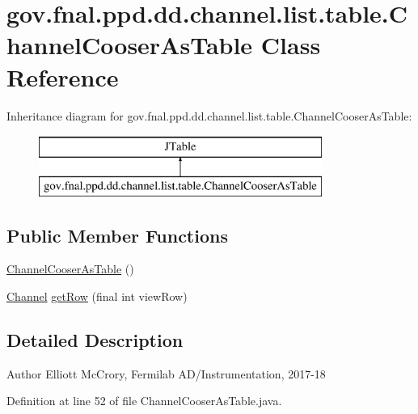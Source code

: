\hypertarget{classgov_1_1fnal_1_1ppd_1_1dd_1_1channel_1_1list_1_1table_1_1ChannelCooserAsTable}{\section{gov.\-fnal.\-ppd.\-dd.\-channel.\-list.\-table.\-Channel\-Cooser\-As\-Table Class Reference}
\label{classgov_1_1fnal_1_1ppd_1_1dd_1_1channel_1_1list_1_1table_1_1ChannelCooserAsTable}
}
Inheritance diagram for gov.\-fnal.\-ppd.\-dd.\-channel.\-list.\-table.\-Channel\-Cooser\-As\-Table\-:\begin{figure}[H]
\begin{center}
\leavevmode
\includegraphics[height=2.000000cm]{classgov_1_1fnal_1_1ppd_1_1dd_1_1channel_1_1list_1_1table_1_1ChannelCooserAsTable}
\end{center}
\end{figure}
\subsection*{Public Member Functions}
\begin{DoxyCompactItemize}
\item 
\hyperlink{classgov_1_1fnal_1_1ppd_1_1dd_1_1channel_1_1list_1_1table_1_1ChannelCooserAsTable_a3e9192a1e78a896dd27ed80ad78277df}{Channel\-Cooser\-As\-Table} ()
\item 
\hyperlink{interfacegov_1_1fnal_1_1ppd_1_1dd_1_1signage_1_1Channel}{Channel} \hyperlink{classgov_1_1fnal_1_1ppd_1_1dd_1_1channel_1_1list_1_1table_1_1ChannelCooserAsTable_acb5af42a57b27a5bffd85fd6e3a3dbcf}{get\-Row} (final int view\-Row)
\end{DoxyCompactItemize}


\subsection{Detailed Description}
\begin{DoxyAuthor}{Author}
Elliott Mc\-Crory, Fermilab A\-D/\-Instrumentation, 2017-\/18 
\end{DoxyAuthor}


Definition at line 52 of file Channel\-Cooser\-As\-Table.\-java.




